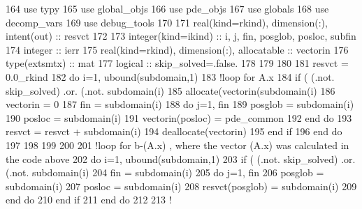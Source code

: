 \begin{DoxyCode}
164       \textcolor{keywordtype}{use }typy
165       \textcolor{keywordtype}{use }global_objs
166       \textcolor{keywordtype}{use }pde_objs
167       \textcolor{keywordtype}{use }globals
168       \textcolor{keywordtype}{use }decomp_vars
169       \textcolor{keywordtype}{use }debug_tools
170 
171       \textcolor{keywordtype}{real(kind=rkind)}, \textcolor{keywordtype}{dimension(:)}, \textcolor{keywordtype}{intent(out)} :: resvct
172       
173       \textcolor{keywordtype}{integer(kind=ikind)} :: i, j, fin, posglob, posloc, subfin
174       \textcolor{keywordtype}{integer} :: ierr
175       \textcolor{keywordtype}{real(kind=rkind)}, \textcolor{keywordtype}{dimension(:)}, \textcolor{keywordtype}{allocatable} :: vectorin
176       \textcolor{keywordtype}{type}(extsmtx) :: mat
177       \textcolor{keywordtype}{logical} :: skip\_solved=.false.
178 
179       
180 
181       resvct = 0.0\_rkind
182       \textcolor{keywordflow}{do} i=1, ubound(subdomain,1)
183         \textcolor{comment}{!loop for A.x}
184         \textcolor{keywordflow}{if} ( (.not. skip\_solved) .or.  (.not. subdomain(i)%
185           \textcolor{keyword}{allocate}(vectorin(subdomain(i)%
186           vectorin = 0
187           fin = subdomain(i)%
188           \textcolor{keywordflow}{do} j=1, fin
189             posglob = subdomain(i)%
190             posloc = subdomain(i)%
191             vectorin(posloc) = pde_common%
192 \textcolor{keywordflow}{          end do}
193           resvct = resvct +  subdomain(i)%
194           \textcolor{keyword}{deallocate}(vectorin)
195 \textcolor{keywordflow}{        end if}
196 \textcolor{keywordflow}{      end do}
197       
198      
199       
200 
201       \textcolor{comment}{!loop for b-(A.x) , where the vector (A.x) was calculated in the code above  }
202       \textcolor{keywordflow}{do} i=1, ubound(subdomain,1)
203         \textcolor{keywordflow}{if} ( (.not. skip\_solved) .or.  (.not. subdomain(i)%
204           fin = subdomain(i)%
205           \textcolor{keywordflow}{do} j=1, fin
206             posglob = subdomain(i)%
207             posloc = subdomain(i)%
208             resvct(posglob) = subdomain(i)%
209 \textcolor{keywordflow}{          end do}
210 \textcolor{keywordflow}{        end if}
211 \textcolor{keywordflow}{      end do}
212 
213 \textcolor{comment}{!}
\end{DoxyCode}

